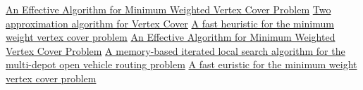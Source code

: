 \documentclass[11pt]{article}
\begin{document}
\pagebreak

\begin{thebibliography}{6}

 \href{https://www.researchgate.net/publication/242463011_An_Effective_Algorithm_for_Minimum_Weighted_Vertex_Cover_problem}{An Effective Algorithm for Minimum Weighted Vertex Cover Problem}
 \href{https://www.cs.umd.edu/class/fall2018/cmsc858E/pdfs/651/vc.pdf} {Two approximation algorithm for Vertex Cover} 
 \href{https://ieeexplore.ieee.org/abstract/document/7550782}{A fast heuristic for the minimum weight vertex cover problem}
 \href{https://www.researchgate.net/publication/242463011_An_Effective_Algorithm_for_Minimum_Weighted_Vertex_Cover_problem}{An Effective Algorithm for Minimum Weighted Vertex Cover Problem}
 \href{https://www.sciencedirect.com/science/article/abs/pii/S0377221720300278}{A memory-based iterated local search algorithm for the multi-depot open vehicle routing problem}
 \href{https://ieeexplore.ieee.org/document/7550782}{A fast euristic for the minimum weight vertex cover problem}

\end{thebibliography}


\pagebreak
\end{document}

